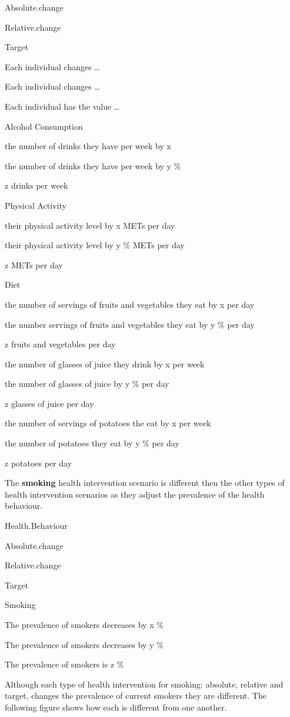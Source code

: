 \documentclass[]{book}
\begin{document}
Absolute.change

Relative.change

Target

Each individual changes \ldots{}

Each individual changes \ldots{}

Each individual has the value \ldots{}

Alcohol Consumption

the number of drinks they have per week by x

the number of drinks they have per week by y \%

z drinks per week

Physical Activity

their physical activity level by x METs per day

their physical activity level by y \% METs per day

z METs per day

Diet

the number of servings of fruits and vegetables they eat by x per day

the number servings of fruits and vegetables they eat by y \% per day

z fruits and vegetables per day

the number of glasses of juice they drink by x per week

the number of glasses of juice by y \% per day

z glasses of juice per day

the number of servings of potatoes the eat by x per week

the number of potatoes they eat by y \% per day

z potatoes per day

The \textbf{smoking} health intervention scenario is different then the
other types of health intervention scenarios as they adjust the
prevalence of the health behaviour.

Health.Behaviour

Absolute.change

Relative.change

Target

Smoking

The prevalence of smokers decreases by x \%

The prevalence of smokers decreases by y \%

The prevalence of smokers is z \%

Although each type of health intervention for smoking: absolute,
relative and target, changes the prevalence of current smokers they are
different. The following figure shows how each is different from one
another.
\end{document}
